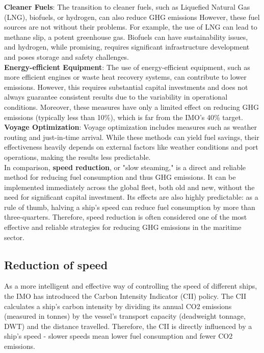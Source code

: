 \documentclass[a4paper,12pt]{article}
\begin{document}
\textbf{Cleaner Fuels}: The transition to cleaner fuels, such as Liquefied Natural Gas (LNG), biofuels, or hydrogen, can also reduce GHG emissions
However, these fuel sources are not without their problems. For example, the use of LNG can lead to methane slip, a potent greenhouse gas.
Biofuels can have sustainability issues, and hydrogen, while promising, requires significant infrastructure development and poses storage and safety challenges.\\

\textbf{Energy-efficient Equipment}: The use of energy-efficient equipment, such as more efficient engines or waste heat recovery systems, can contribute to lower emissions. However, this requires substantial capital investments and does not always guarantee consistent results due to the variability in operational conditions.
Moreover, these measures have only a limited effect on reducing GHG emissions (typically less than 10\%), which is far from the IMO's 40\% target.\\

\textbf{Voyage Optimization}: Voyage optimization includes measures such as weather routing and just-in-time arrival. While these methods can yield fuel savings, their effectiveness heavily depends on external factors like weather conditions and port operations, making the results less predictable.\\

In comparison, \textbf{speed reduction}, or "slow steaming," is a direct and reliable method for reducing fuel consumption and thus GHG emissions.
It can be implemented immediately across the global fleet, both old and new, without the need for significant capital investment.
Its effects are also highly predictable: as a rule of thumb, halving a ship's speed can reduce fuel consumption by more than three-quarters.
Therefore, speed reduction is often considered one of the most effective and reliable strategies for reducing GHG emissions in the maritime sector.\\

\subsection{Reduction of speed}
As a more intelligent and effective way of controlling the speed of different ships, the IMO has introduced the Carbon Intensity Indicator (CII) policy.
The CII calculates a ship's carbon intensity by dividing its annual CO2 emissions (measured in tonnes) by the vessel's transport capacity (deadweight tonnage, DWT) and the distance travelled. Therefore, the CII is directly influenced by a ship's speed - slower speeds mean lower fuel consumption and fewer CO2 emissions.\\
\end{document}
